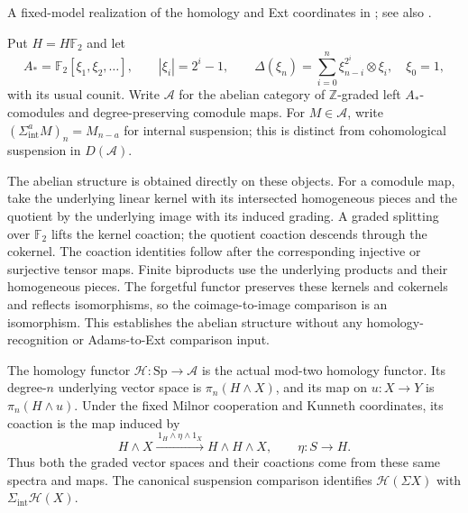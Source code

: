 \begin{definition}
\label{sem:AdamsSynthetic:coefficient-ext}
A fixed-model realization of the homology and Ext coordinates in
\cite[Theorem 9.12(5) and Corollary 9.13]{BHS}; see also
\cite[Lemma 4.29 and Lemma 4.56]{Pst}.\par
Put $H=H\mathbb F_2$ and let
\[
A_*=\mathbb F_2[\xi_1,\xi_2,\ldots],\qquad
|\xi_i|=2^i-1,\qquad
\Delta(\xi_n)=\sum_{i=0}^n\xi_{n-i}^{2^i}\otimes\xi_i,
\quad \xi_0=1,
\]
with its usual counit. Write $\mathcal A$ for the abelian category of
$\mathbb Z$-graded left $A_*$-comodules and degree-preserving comodule
maps. For $M\in\mathcal A$, write
$(\Sigma_{\mathrm{int}}^aM)_n=M_{n-a}$ for internal suspension;
this is distinct from cohomological suspension in
$D(\mathcal A)$.

The abelian structure is obtained directly on these objects. For a
comodule map, take the underlying linear kernel with its intersected
homogeneous pieces and the quotient by the underlying image with its
induced grading. A graded splitting over $\mathbb F_2$ lifts the
kernel coaction; the quotient coaction descends through the cokernel.
The coaction identities follow after the corresponding injective or
surjective tensor maps. Finite biproducts use the underlying products
and their homogeneous pieces. The forgetful functor preserves these
kernels and cokernels and reflects isomorphisms, so the coimage-to-image
comparison is an isomorphism. This establishes the abelian structure
without any homology-recognition or Adams-to-Ext comparison input.

The homology functor $\mathcal H:\mathrm{Sp}\to\mathcal A$ is the
actual mod-two homology functor. Its degree-$n$ underlying vector space
is $\pi_n(H\wedge X)$, and its map on $u:X\to Y$ is
$\pi_n(H\wedge u)$. Under the fixed Milnor cooperation and Kunneth
coordinates, its coaction is the map induced by
\[
H\wedge X\xrightarrow{\,1_H\wedge\eta\wedge1_X\,}
H\wedge H\wedge X,
\qquad \eta:S\to H.
\]
Thus both the graded vector spaces and their coactions come from these
same spectra and maps. The canonical suspension comparison identifies
$\mathcal H(\Sigma X)$ with $\Sigma_{\mathrm{int}}\mathcal H(X)$.


\end{definition}
